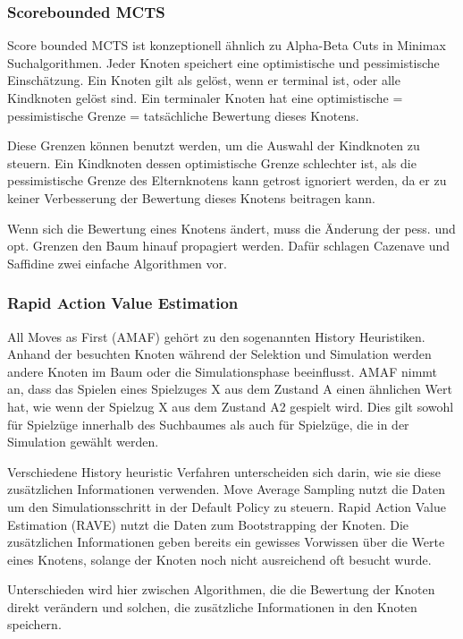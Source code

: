 \subsubsection{Scorebounded MCTS}

Score bounded MCTS ist konzeptionell ähnlich zu Alpha-Beta Cuts in Minimax Suchalgorithmen. Jeder Knoten speichert eine optimistische und pessimistische Einschätzung. Ein Knoten gilt als gelöst, wenn er terminal ist, oder alle Kindknoten gelöst sind. Ein terminaler Knoten hat eine optimistische = pessimistische Grenze = tatsächliche Bewertung dieses Knotens.\\
\par
Diese Grenzen können benutzt werden, um die Auswahl der Kindknoten zu steuern. Ein Kindknoten dessen optimistische Grenze schlechter ist, als die pessimistische Grenze des Elternknotens kann getrost ignoriert werden, da er zu keiner Verbesserung der Bewertung dieses Knotens beitragen kann.\\
\par
Wenn sich die Bewertung eines Knotens ändert, muss die Änderung der pess. und opt. Grenzen den Baum hinauf propagiert werden. Dafür schlagen Cazenave und Saffidine zwei einfache Algorithmen vor.

\subsubsection{Rapid Action Value Estimation}

All Moves as First (AMAF) gehört zu den sogenannten History Heuristiken. Anhand der besuchten Knoten während der Selektion und Simulation werden andere Knoten im Baum oder die Simulationsphase beeinflusst. AMAF nimmt an, dass das Spielen eines Spielzuges X aus dem Zustand A einen ähnlichen Wert hat, wie wenn der Spielzug X aus dem Zustand A2 gespielt wird. Dies gilt sowohl für Spielzüge innerhalb des Suchbaumes als auch für Spielzüge, die in der Simulation gewählt werden.
\par
Verschiedene History heuristic Verfahren unterscheiden sich darin, wie sie diese zusätzlichen Informationen verwenden. Move Average Sampling nutzt die Daten um den Simulationsschritt in der Default Policy zu steuern. Rapid Action Value Estimation (RAVE) nutzt die Daten zum Bootstrapping der Knoten. Die zusätzlichen Informationen geben bereits ein gewisses Vorwissen über die Werte eines Knotens, solange der Knoten noch nicht ausreichend oft besucht wurde.
\par
Unterschieden wird hier zwischen Algorithmen, die die Bewertung der Knoten direkt verändern und solchen, die zusätzliche Informationen in den Knoten speichern.